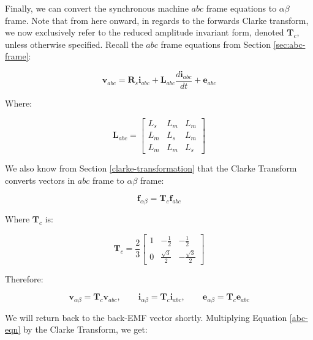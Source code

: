 \documentclass{article}
\begin{document}
Finally, we can convert the synchronous machine $abc$ frame equations to $\alpha\beta$ frame. Note that from here onward, in regards to the forwards Clarke transform, we now exclusively refer to the reduced amplitude invariant form, denoted $\mathbf{T}_c$, unless otherwise specified. Recall the $abc$ frame equations from Section \ref{sec:abc-frame}:

\begin{equation}
\label{abc-eqn}
    \mathbf{v}_{abc} = \mathbf{R}_s\mathbf{i}_{abc} + \mathbf{L}_{abc}\frac{d\mathbf{i}_{abc}}{dt} + \boldsymbol{e}_{abc}
\end{equation}

Where:

\begin{equation}
    \mathbf{L}_{abc} =
    \begin{bmatrix}
        L_s & L_m & L_m \\
        L_m & L_s & L_m \\
        L_m & L_m & L_s
    \end{bmatrix}
\end{equation}

We also know from Section \ref{clarke-transformation} that the Clarke Transform converts vectors in $abc$ frame to $\alpha\beta$ frame:

\begin{equation}
    \mathbf{f}_{\alpha\beta} = \mathbf{T}_c \mathbf{f}_{abc}
\end{equation}

Where $\mathbf{T}_c$ is:

\begin{equation}
    \mathbf{T}_c =
    \frac{2}{3}
    \begin{bmatrix}
        1 & -\frac{1}{2} & -\frac{1}{2} \\
        0 & \frac{\sqrt{3}}{2} & -\frac{\sqrt{3}}{2}
    \end{bmatrix}
\end{equation}

Therefore:

\begin{equation}
    \mathbf{v}_{\alpha\beta} = \mathbf{T}_c \mathbf{v}_{abc}, \qquad
    \mathbf{i}_{\alpha\beta} = \mathbf{T}_c \mathbf{i}_{abc}, \qquad
    \mathbf{e}_{\alpha\beta} = \mathbf{T}_c \mathbf{e}_{abc}
\end{equation}

We will return back to the back-EMF vector shortly. Multiplying Equation \ref{abc-eqn} by the Clarke Transform, we get:
\end{document}
